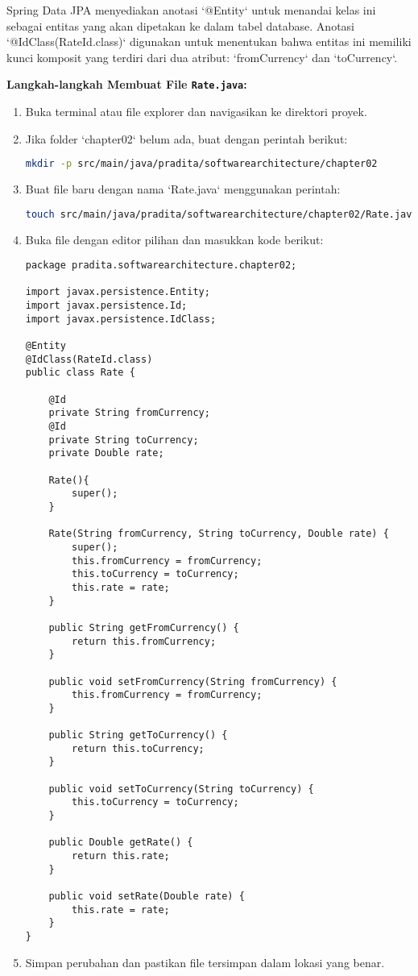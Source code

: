 Spring Data JPA menyediakan anotasi `@Entity` untuk menandai kelas ini sebagai entitas yang akan dipetakan ke dalam tabel database. Anotasi `@IdClass(RateId.class)` digunakan untuk menentukan bahwa entitas ini memiliki kunci komposit yang terdiri dari dua atribut: `fromCurrency` dan `toCurrency`.

\textbf{Langkah-langkah Membuat File \texttt{Rate.java}:}

\begin{enumerate}
\item Buka terminal atau file explorer dan navigasikan ke direktori proyek.
\item Jika folder `chapter02` belum ada, buat dengan perintah berikut:

\begin{lstlisting}[language=bash]
mkdir -p src/main/java/pradita/softwarearchitecture/chapter02
\end{lstlisting}

\item Buat file baru dengan nama `Rate.java` menggunakan perintah:

\begin{lstlisting}[language=bash]
touch src/main/java/pradita/softwarearchitecture/chapter02/Rate.java
\end{lstlisting}

\item Buka file dengan editor pilihan dan masukkan kode berikut:

\begin{lstlisting}[style=JavaStyle]
package pradita.softwarearchitecture.chapter02;

import javax.persistence.Entity;
import javax.persistence.Id;
import javax.persistence.IdClass;

@Entity
@IdClass(RateId.class)
public class Rate {
	
	@Id
	private String fromCurrency;
	@Id
	private String toCurrency;
	private Double rate;
	
	Rate(){
		super();
	}
	
	Rate(String fromCurrency, String toCurrency, Double rate) {
		super();
		this.fromCurrency = fromCurrency;
		this.toCurrency = toCurrency;
		this.rate = rate;
	}
	
	public String getFromCurrency() {
		return this.fromCurrency;
	}
	
	public void setFromCurrency(String fromCurrency) {
		this.fromCurrency = fromCurrency;
	}
	
	public String getToCurrency() {
		return this.toCurrency;
	}
	
	public void setToCurrency(String toCurrency) {
		this.toCurrency = toCurrency;
	}
	
	public Double getRate() {
		return this.rate;
	}
	
	public void setRate(Double rate) {
		this.rate = rate;
	}
}
\end{lstlisting}

\item Simpan perubahan dan pastikan file tersimpan dalam lokasi yang benar.
\end{enumerate}

